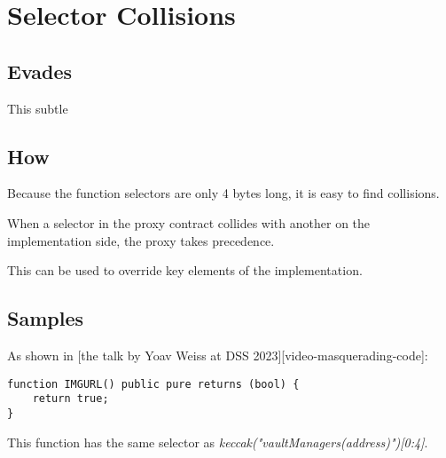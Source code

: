 \section{Selector Collisions}

\subsection{Evades}

This subtle 

\subsection{How}

Because the function selectors are only 4 bytes long, it is easy to find collisions.

When a selector in the proxy contract collides with another on the implementation side, the proxy takes precedence.

This can be used to override key elements of the implementation.

\subsection{Samples}

As shown in [the talk by Yoav Weiss at DSS 2023][video-masquerading-code]:

\begin{highlight}
\begin{lstlisting}
function IMGURL() public pure returns (bool) {
	return true;
}
\end{lstlisting}
\end{highlight}

This function has the same selector as \emph{keccak("vaultManagers(address)")[0:4]}.
